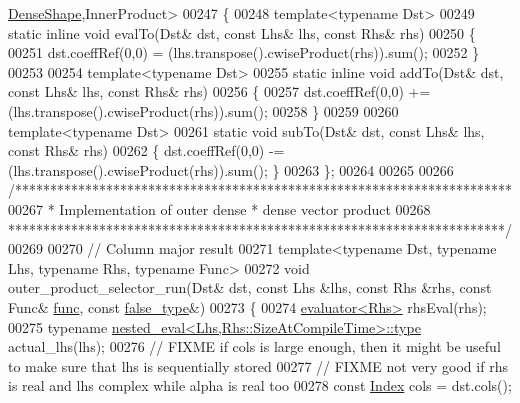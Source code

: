 \begin{DoxyCode}
      \hyperlink{struct_eigen_1_1_dense_shape}{DenseShape},InnerProduct>
00247 \{
00248   \textcolor{keyword}{template}<\textcolor{keyword}{typename} Dst>
00249   \textcolor{keyword}{static} \textcolor{keyword}{inline} \textcolor{keywordtype}{void} evalTo(Dst& dst, \textcolor{keyword}{const} Lhs& lhs, \textcolor{keyword}{const} Rhs& rhs)
00250   \{
00251     dst.coeffRef(0,0) = (lhs.transpose().cwiseProduct(rhs)).sum();
00252   \}
00253   
00254   \textcolor{keyword}{template}<\textcolor{keyword}{typename} Dst>
00255   \textcolor{keyword}{static} \textcolor{keyword}{inline} \textcolor{keywordtype}{void} addTo(Dst& dst, \textcolor{keyword}{const} Lhs& lhs, \textcolor{keyword}{const} Rhs& rhs)
00256   \{
00257     dst.coeffRef(0,0) += (lhs.transpose().cwiseProduct(rhs)).sum();
00258   \}
00259   
00260   \textcolor{keyword}{template}<\textcolor{keyword}{typename} Dst>
00261   \textcolor{keyword}{static} \textcolor{keywordtype}{void} subTo(Dst& dst, \textcolor{keyword}{const} Lhs& lhs, \textcolor{keyword}{const} Rhs& rhs)
00262   \{ dst.coeffRef(0,0) -= (lhs.transpose().cwiseProduct(rhs)).sum(); \}
00263 \};
00264 
00265 
00266 \textcolor{comment}{/***********************************************************************}
00267 \textcolor{comment}{*  Implementation of outer dense * dense vector product}
00268 \textcolor{comment}{***********************************************************************/}
00269 
00270 \textcolor{comment}{// Column major result}
00271 \textcolor{keyword}{template}<\textcolor{keyword}{typename} Dst, \textcolor{keyword}{typename} Lhs, \textcolor{keyword}{typename} Rhs, \textcolor{keyword}{typename} Func>
00272 \textcolor{keywordtype}{void} outer\_product\_selector\_run(Dst& dst, \textcolor{keyword}{const} Lhs &lhs, \textcolor{keyword}{const} Rhs &rhs, \textcolor{keyword}{const} Func& 
      \hyperlink{structfunc}{func}, \textcolor{keyword}{const} \hyperlink{struct_eigen_1_1internal_1_1false__type}{false\_type}&)
00273 \{
00274   \hyperlink{struct_eigen_1_1internal_1_1evaluator}{evaluator<Rhs>} rhsEval(rhs);
00275   \textcolor{keyword}{typename} \hyperlink{class_eigen_1_1internal_1_1_tensor_lazy_evaluator_writable}{nested\_eval<Lhs,Rhs::SizeAtCompileTime>::type} 
      actual\_lhs(lhs);
00276   \textcolor{comment}{// FIXME if cols is large enough, then it might be useful to make sure that lhs is sequentially stored}
00277   \textcolor{comment}{// FIXME not very good if rhs is real and lhs complex while alpha is real too}
00278   \textcolor{keyword}{const} \hyperlink{namespace_eigen_a62e77e0933482dafde8fe197d9a2cfde}{Index} cols = dst.cols();

\end{DoxyCode}
